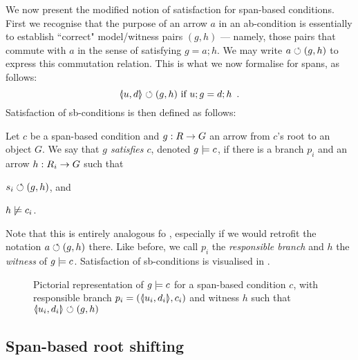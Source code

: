 \medskip\noindent We now present the modified notion of satisfaction for span-based conditions. First we recognise that the purpose of an arrow $a$ in an ab-condition is essentially to establish ``correct" model/witness pairs $(g,h)$ --- namely, those pairs that commute with $a$ in the sense of satisfying $g=a;h$. We may write $a\circlearrowleft (g,h)$ to express this commutation relation. This is what we now formalise for spans, as follows:
\[ \spanof u d \commutes (g,h) \text{ if } u;g=d;h \enspace. \]
Satisfaction of sb-conditions is then defined as follows:

\begin{definition}
  Let $c$ be a span-based condition and $g:R\rightarrow G$ an arrow from $c$'s root to an object $G$. We say that \emph{$g$ satisfies $c$}, denoted $g\models c$, if there is a branch $p_i$ and an arrow $h:R_i\rightarrow G$ such that
  \begin{enumerate*}
  \item $s_i \circlearrowleft (g, h)$, and
  \item $h\not\models c_i$.
  \end{enumerate*}
\end{definition}
%
Note that this is entirely analogous fo , especially if we would retrofit the notation $a\circlearrowleft (g,h)$ there. Like before, we call $p_i$ the \emph{responsible branch} and $h$ the \emph{witness} of $g\models c$. Satisfaction of sb-conditions is visualised in .
%
\begin{figure}
  \centering
  
  \caption{Pictorial representation of $g\models c$ for a span-based condition $c$, with responsible branch $p_i=(\spanof{u_i}{d_i},c_i)$ and witness $h$ such that $\spanof{u_i}{d_i}\commutes (g,h)$}
\end{figure}

\subsection{Span-based root shifting}

